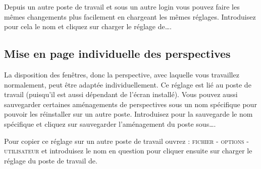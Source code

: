 Depuis un autre poste de travail et sous un autre login vous pouvez faire les mêmes changements plus facilement en chargeant les mêmes réglages. Introduisez pour cela le nom et cliquez sur \glqq charger le réglage de\ldots\grqq{}.

\subsection{Mise en page individuelle des perspectives}
La disposition des fenêtres, donc la perspective, avec laquelle vous travaillez normalement, peut être adaptée individuellement. Ce réglage est lié au poste de travail (puisqu'il est aussi dépendant de l'écran installé). Vous pouvez aussi sauvegarder certaines aménagements de perspectives sous un nom spécifique pour pouvoir les réinstaller sur un autre poste. Introduisez pour la sauvegarde le nom spécifique et cliquez sur \glqq
sauvegarder l'aménagement du poste sous\ldots\grqq{}.

Pour copier ce réglage sur un autre poste de travail ouvrez : \textsc{fichier - options - utilisateur} et introduisez le nom en question pour cliquer ensuite sur \glqq charger le réglage du poste de travail de\grqq{}.


